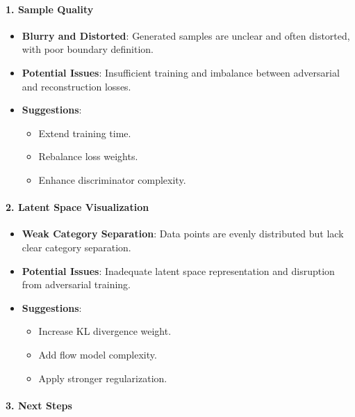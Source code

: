 \documentclass[11pt]{article}
\providecommand{\tightlist}{%
      \setlength{\itemsep}{0pt}\setlength{\parskip}{0pt}}
\begin{document}
\paragraph{\texorpdfstring{1. \textbf{Sample
Quality}}{1. Sample Quality}}\label{sample-quality}

\begin{itemize}
\item
  \textbf{Blurry and Distorted}: Generated samples are unclear and often
  distorted, with poor boundary definition.
\item
  \textbf{Potential Issues}: Insufficient training and imbalance between
  adversarial and reconstruction losses.
\item
  \textbf{Suggestions}:

  \begin{itemize}
  \tightlist
  \item
    Extend training time.
  \item
    Rebalance loss weights.
  \item
    Enhance discriminator complexity.
  \end{itemize}
\end{itemize}

\paragraph{\texorpdfstring{2. \textbf{Latent Space
Visualization}}{2. Latent Space Visualization}}\label{latent-space-visualization}

\begin{itemize}
\item
  \textbf{Weak Category Separation}: Data points are evenly distributed
  but lack clear category separation.
\item
  \textbf{Potential Issues}: Inadequate latent space representation and
  disruption from adversarial training.
\item
  \textbf{Suggestions}:

  \begin{itemize}
  \tightlist
  \item
    Increase KL divergence weight.
  \item
    Add flow model complexity.
  \item
    Apply stronger regularization.
  \end{itemize}
\end{itemize}

\paragraph{\texorpdfstring{3. \textbf{Next
Steps}}{3. Next Steps}}\label{next-steps}
\end{document}
